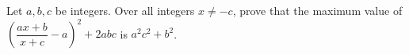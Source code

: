 Let $a,b,c$ be integers. Over all integers $x\ne-c$, prove that the maximum value of $\left(\dfrac{ax+b}{x+c}-a\right)^2+2abc$ is $a^2c^2+b^2$.

